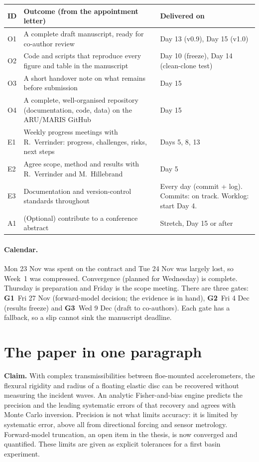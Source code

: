 \documentclass[10pt,a4paper]{article}
\newcommand{\gate}[1]{\textcolor{must}{\textbf{#1}}}
\begin{document}
\begin{center}\small
\begin{tabularx}{\linewidth}{@{}l L l@{}}
\toprule
ID & Outcome (from the appointment letter) & Delivered on \\
\midrule
O1 & A complete draft manuscript, ready for co-author review & Day 13 (v0.9), Day 15 (v1.0) \\
O2 & Code and scripts that reproduce every figure and table in the manuscript & Day 10 (freeze), Day 14 (clean-clone test) \\
O3 & A short handover note on what remains before submission & Day 15 \\
O4 & A complete, well-organised repository (documentation, code, data) on the ARU/MARIS GitHub & Day 15 \\
\midrule
E1 & Weekly progress meetings with R.\ Verrinder: progress, challenges, risks, next steps & Days 5, 8, 13 \\
E2 & Agree scope, method and results with R.\ Verrinder and M.\ Hillebrand & Day 5 \\
E3 & Documentation and version-control standards throughout & Every day (commit + log). Commits: on track. Worklog: start Day 4. \\
A1 & (Optional) contribute to a conference abstract & Stretch, Day 15 or after \\
\bottomrule
\end{tabularx}
\end{center}

\paragraph{Calendar.} Mon 23 Nov was spent on the contract and Tue 24 Nov was largely lost, so Week~1 was compressed. Convergence (planned for Wednesday) is complete. Thursday is preparation and Friday is the scope meeting. There are three gates: \gate{G1}~Fri 27 Nov (forward-model decision; the evidence is in hand), \gate{G2}~Fri 4 Dec (results freeze) and \gate{G3}~Wed 9 Dec (draft to co-authors). Each gate has a fallback, so a slip cannot sink the manuscript deadline.

\section{The paper in one paragraph}
\textbf{Claim.} With complex transmissibilities between floe-mounted accelerometers, the flexural rigidity and radius of a floating elastic disc can be recovered without measuring the incident waves. An analytic Fisher-and-bias engine predicts the precision and the leading systematic errors of that recovery and agrees with Monte Carlo inversion. Precision is not what limits accuracy: it is limited by systematic error, above all from directional forcing and sensor metrology. Forward-model truncation, an open item in the thesis, is now converged and quantified. These limits are given as explicit tolerances for a first basin experiment.
\end{document}
